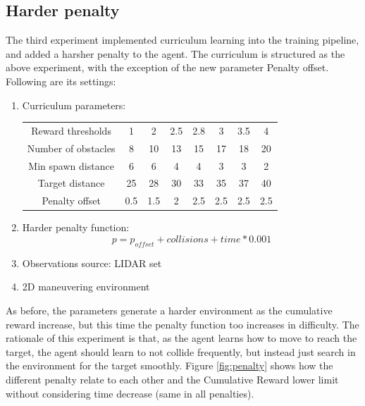 \documentclass{ifacconf}
\begin{document}
\subsection{Harder penalty}
The third experiment implemented curriculum learning into the training pipeline, and added a harsher penalty to the agent. The curriculum is structured as the above experiment, with the exception of the new parameter Penalty offset. Following are its settings:
\begin{enumerate}
    \item Curriculum parameters:
        \begin{table}[ht]
            \centering
            \begin{tabular}[t]{cccccccc}
                Reward thresholds&1&2&2.5&2.8&3&3.5&4\\
                Number of obstacles&8&10&13&15&17&18&20\\
                Min spawn distance&6&6&4&4&3&3&2\\
                Target distance&25&28&30&33&35&37&40\\
                Penalty offset&0.5&1.5&2&2.5&2.5&2.5&2.5\\
            \end{tabular}
        \end{table}%
    \item Harder penalty function: $$p=p_{offset}+collisions+time*0.001$$
    \item Observations source: LIDAR set
    \item 2D maneuvering environment
\end{enumerate}

As before, the parameters generate a harder environment as the cumulative reward increase, but this time the penalty function too increases in difficulty. The rationale of this experiment is that, as the agent learns how to move to reach the target, the agent should learn to not collide frequently, but instead just search in the environment for the target smoothly. Figure \ref{fig:penalty} shows how the different penalty relate to each other and the Cumulative Reward lower limit without considering time decrease (same in all penalties).
\end{document}
